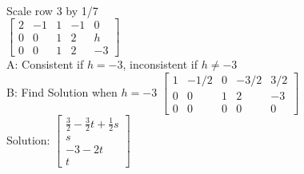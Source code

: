 \documentclass{article}
\begin{document}
\\[0.05in]Scale row 3 by 1/7\\[0.05in]
$\left[\begin{array}{cccc|c}
2 & -1 & 1 & -1 & 0 \\
0 & 0 & 1 & 2 & h \\
0 & 0 & 1 & 2 & -3
\end{array}\right]$\\[0.05in]
A: Consistent if $h=-3$, inconsistent if $h\neq -3$\\
B: Find Solution when $h=-3$
$\left[\begin{array}{cccc|c}
1 & -1/2 & 0 & -3/2 & 3/2 \\
0 & 0 & 1 & 2 & -3 \\
0 & 0 & 0 & 0 & 0
\end{array}\right]$
\\[0.1in]Solution:
$\left[\begin{array}{c}
\frac{3}{2}-\frac{3}{2}t+\frac{1}{2}s \\
s \\
-3-2t \\
t
\end{array}\right]$
\end{document}
